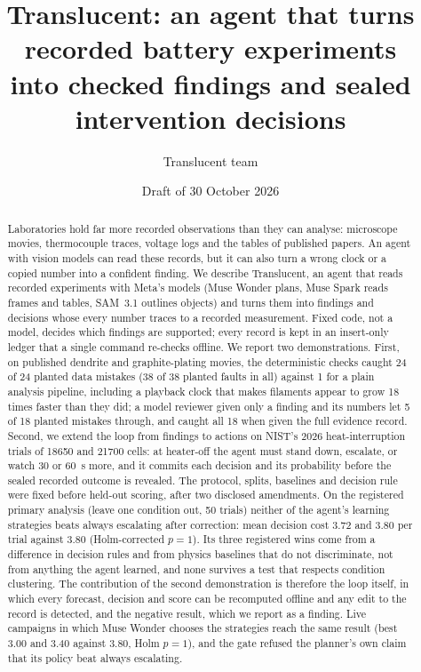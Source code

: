\documentclass[11pt]{article}
\title{Translucent: an agent that turns recorded battery experiments\\into checked findings and sealed intervention decisions}
\author{Translucent team}
\date{Draft of 30 October 2026}
\begin{document}
\maketitle

\begin{abstract}
Laboratories hold far more recorded observations than they can analyse: microscope movies, thermocouple traces,
voltage logs and the tables of published papers. An agent with vision models can read these records, but it can
also turn a wrong clock or a copied number into a confident finding. We describe Translucent, an agent that reads
recorded experiments with Meta's models (Muse Wonder plans, Muse Spark reads frames and tables, SAM~3.1 outlines
objects) and turns them into findings and decisions whose every number traces to a recorded measurement. Fixed code, not a model,
decides which findings are supported; every record is kept in an insert-only ledger that a single command re-checks
offline. We report two demonstrations. First, on published dendrite and graphite-plating movies, the deterministic
checks caught 24 of 24 planted data mistakes (38 of 38 planted faults in all) against 1 for a plain analysis
pipeline, including a playback clock that makes filaments appear to grow 18 times faster than they did; a model
reviewer given only a finding and its numbers let 5 of 18 planted mistakes through, and caught all 18 when given the
full evidence record. Second, we extend the loop from findings to actions on NIST's 2026 heat-interruption trials of
18650 and 21700 cells: at heater-off the agent must stand down, escalate, or watch 30 or 60~s more, and it commits
each decision and its probability before the sealed recorded outcome is revealed. The protocol, splits, baselines
and decision rule were fixed before held-out scoring, after two disclosed amendments. On the registered primary
analysis (leave one condition out, 50 trials) neither of the agent's learning strategies beats always escalating
after correction: mean decision cost 3.72 and 3.80 per trial against 3.80 (Holm-corrected $p = 1$). Its three
registered wins come from a difference in decision rules and from physics baselines that do not discriminate, not
from anything the agent learned, and none survives a test that respects condition clustering. The contribution of
the second demonstration is therefore the loop itself, in which every forecast, decision and score can be
recomputed offline and any edit to the record is detected, and the negative result, which we report as a finding.
Live campaigns in which Muse Wonder chooses the strategies reach the same result (best 3.00 and 3.40 against 3.80,
Holm $p = 1$), and the gate refused the planner's own claim that its policy beat always escalating.
\end{abstract}
\end{document}
